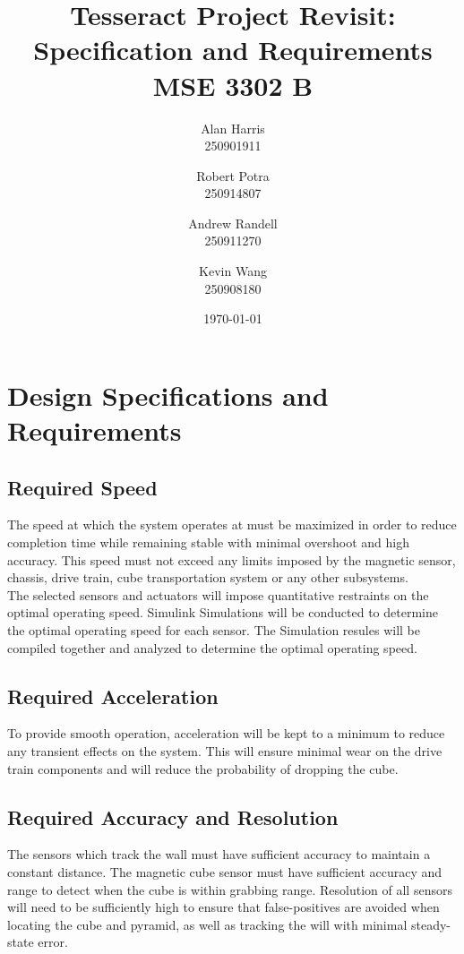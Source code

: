 \documentclass[12pt]{article}
\begin{document}
\title{\textbf{Tesseract Project Revisit:\\Specification and Requirements\\ MSE 3302 B}}
\author{
  Alan Harris\\
  250901911
  \and
  Robert Potra\\
  250914807
  \and
  Andrew Randell\\
  250911270
  \and
  Kevin Wang\\
  250908180
}
\date{\today}
\maketitle

\tableofcontents
\thispagestyle{empty}

\pagebreak
\setcounter{page}{1}
 
\section{Design Specifications and Requirements}
\subsection{Required Speed}
The speed at which the system operates at must be maximized in order to reduce completion time while remaining stable with minimal overshoot and high accuracy. This speed must not exceed any limits imposed by the magnetic sensor, chassis, drive train, cube transportation system or any other subsystems.  \\

The selected sensors and actuators will impose quantitative restraints on the optimal operating speed. Simulink Simulations will be conducted to determine the optimal operating speed for each sensor. The Simulation resules will be compiled together and analyzed to determine the optimal operating speed.

\subsection{Required Acceleration}
To provide smooth operation, acceleration will be kept to a minimum to reduce any transient effects on the system. This will ensure minimal wear on the drive train components and will reduce the probability of dropping the cube. 
\subsection{Required Accuracy and Resolution}
The sensors which track the wall must have sufficient accuracy to maintain a constant distance. The magnetic cube sensor must have sufficient accuracy and range to detect when the cube is within grabbing range. Resolution of all sensors will need to be sufficiently high to ensure that false-positives are avoided when locating the cube and pyramid, as well as tracking the will with minimal steady-state error.  
\end{document}
